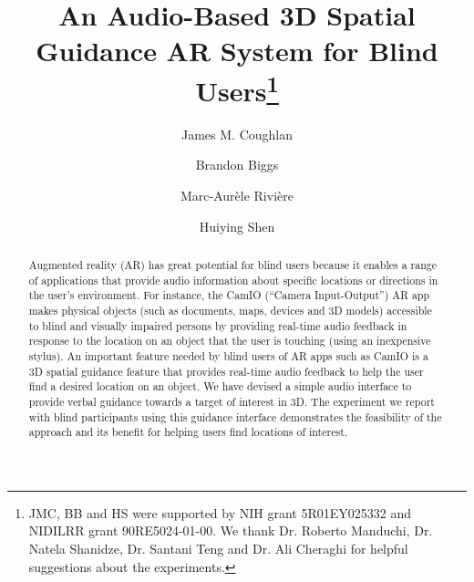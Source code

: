 \documentclass[runningheads]{res/templates/llncs}
\begin{document}
\title{An Audio-Based 3D Spatial Guidance AR System for Blind Users\thanks{JMC, BB and HS were supported by NIH grant 5R01EY025332 and NIDILRR grant 90RE5024-01-00. We thank Dr. Roberto Manduchi, Dr. Natela Shanidze, Dr. Santani Teng and Dr. Ali Cheraghi for helpful suggestions about the experiments.}}


\author{James M. Coughlan \and
Brandon Biggs \and
Marc-Aurèle Rivière \and
Huiying Shen}


%
\maketitle %
%
\begin{abstract}
Augmented reality (AR) has great potential for blind users because it
enables a range of applications that provide audio information about
specific locations or directions in the user's environment. For
instance, the CamIO (``Camera Input-Output'') AR app makes physical
objects (such as documents, maps, devices and 3D models) accessible to
blind and visually impaired persons by providing real-time audio
feedback in response to the location on an object that the user is
touching (using an inexpensive stylus). An important feature needed by
blind users of AR apps such as CamIO is a 3D spatial guidance feature
that provides real-time audio feedback to help the user find a desired
location on an object. We have devised a simple audio interface to
provide verbal guidance towards a target of interest in 3D. The
experiment we report with blind participants using this guidance
interface demonstrates the feasibility of the approach and its benefit
for helping users find locations of interest.

\end{abstract}
%
\end{document}
